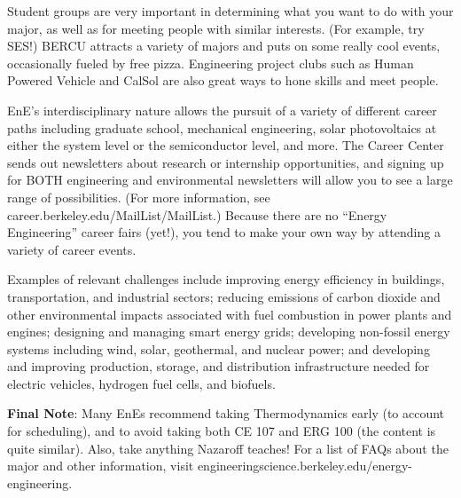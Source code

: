 Student groups are very important in determining what you want to do with your major, as well as for meeting people with similar interests. (For example, try SES!) BERCU attracts a variety of majors and puts on some really cool events, occasionally fueled by free pizza. Engineering project clubs such as Human Powered Vehicle and CalSol are also great ways to hone skills and meet people.
 
EnE’s interdisciplinary nature allows the pursuit of a variety of different career paths including graduate school, mechanical engineering, solar photovoltaics at either the system level or the semiconductor level, and more. The Career Center sends out newsletters about research or internship opportunities, and signing up for BOTH engineering and environmental newsletters will allow you to see a large range of possibilities. (For more information, see {\selectfont career.berkeley.edu/MailList/MailList}.) Because there are no “Energy Engineering” career fairs (yet!), you tend to make your own way by attending a variety of career events.
 
Examples of relevant challenges include improving energy efficiency in buildings, transportation, and industrial sectors; reducing emissions of carbon dioxide and other environmental impacts associated with fuel combustion in power plants and engines; designing and managing smart energy grids; developing non-fossil energy systems including wind, solar, geothermal, and nuclear power; and developing and improving production, storage, and distribution infrastructure needed for electric vehicles, hydrogen fuel cells, and biofuels.

\textbf{Final Note}: Many EnEs recommend taking Thermodynamics early (to account for scheduling), and to avoid taking both CE 107 and ERG 100 (the content is quite similar). Also, take anything Nazaroff teaches! For a list of FAQs about the major and other information, visit {\selectfont engineeringscience.berkeley.edu/energy-engineering}.

